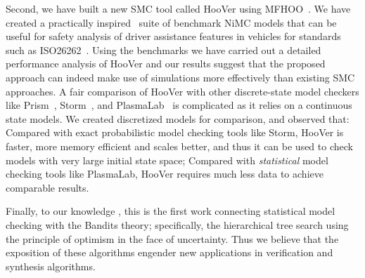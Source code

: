 \documentclass[11pt]{article}
\theoremstyle{definition}
\newcommand{\sayan}[1]{\textcolor{blue}{#1}}
\newcommand{\modelname}{NiMC\xspace}
\newcommand{\toolname}{{{\sf HooVer}\xspace}}
\begin{document}
Second, we have built a new SMC tool called \toolname{} using  MFHOO~\cite{sen2019noisy}.
We have created a practically inspired~\cite{simonepresent,FanQM18} suite of benchmark \modelname models that can be useful for safety analysis of driver assistance features in vehicles for standards such as ISO26262~\cite{iso26262}.
Using the benchmarks we have carried out a detailed performance analysis of \toolname{} and our results suggest that the proposed approach can indeed make use of simulations more effectively than existing SMC approaches.
A fair comparison of \toolname{} with other discrete-state model checkers like  Prism~\cite{HKNP06}, Storm~\cite{dehnert2017storm}, and PlasmaLab~\cite{legay2016plasma} is complicated as it relies on a continuous state models. We  created  discretized models for comparison, and observed that: Compared with exact probabilistic model checking tools like Storm, \toolname{} is faster, more memory efficient and scales better, and thus it can be used to check models with very large initial state space; Compared with {\em statistical} model checking tools like PlasmaLab, \toolname{} requires much less data to achieve comparable results.


Finally, to our knowledge
, this is the first work connecting statistical model checking with the Bandits theory;  specifically, the hierarchical tree search using the principle of optimism in the face of uncertainty. Thus we believe that the exposition of these algorithms engender  new applications in verification and synthesis algorithms.

%
\end{document}
